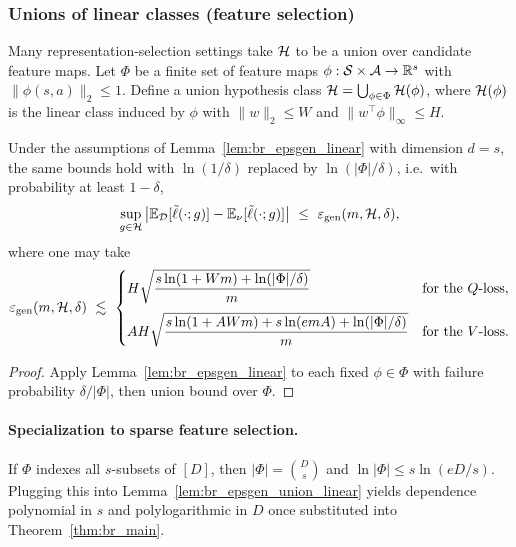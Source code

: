 \subsubsection{Unions of linear classes (feature selection)}

Many representation-selection settings take $\mathcal{H}$ to be a union over candidate feature maps.
Let $\Phi$ be a finite set of feature maps $\phi:\mathcal{S}\times\mathcal{A}\to\mathbb{R}^s$ with $\|\phi(s,a)\|_2\le 1$.
Define a union hypothesis class $\mathcal{H}=\bigcup_{\phi\in\Phi}\mathcal{H}(\phi)$, where $\mathcal{H}(\phi)$ is the
linear class induced by $\phi$ with $\|w\|_2\le W$ and $\|w^\top\phi\|_\infty\le H$.

\begin{lemma}
\label{lem:br_epsgen_union_linear}
Under the assumptions of Lemma~\ref{lem:br_epsgen_linear} with dimension $d=s$,
the same bounds hold with $\ln(1/\delta)$ replaced by $\ln(|\Phi|/\delta)$, i.e.\ with probability at
least $1-\delta$,
\[
\sup_{g\in\mathcal{H}}\big|\mathbb{E}_{\mathcal{D}}[\tilde{\ell}(\cdot;g)]-\mathbb{E}_{\nu}[\tilde{\ell}(\cdot;g)]\big|
\ \le\
\varepsilon_{\mathrm{gen}}(m,\mathcal{H},\delta),
\]
where one may take
\[
\varepsilon_{\mathrm{gen}}(m,\mathcal{H},\delta)
\ \lesssim\
\begin{cases}
H\sqrt{\dfrac{s\ln(1+Wm)+\ln(|\Phi|/\delta)}{m}} & \text{for the $Q$-loss},\\[10pt]
AH\sqrt{\dfrac{s\ln(1+AWm)+s\ln(e m A)+\ln(|\Phi|/\delta)}{m}} & \text{for the $V$-loss}.
\end{cases}
\]
\end{lemma}

\begin{proof}
Apply Lemma~\ref{lem:br_epsgen_linear} to each fixed $\phi\in\Phi$ with failure probability $\delta/|\Phi|$,
then union bound over $\Phi$.
\end{proof}

\paragraph{Specialization to sparse feature selection.}
If $\Phi$ indexes all $s$-subsets of $[D]$, then $|\Phi|=\binom{D}{s}$ and
$\ln|\Phi|\le s\ln(eD/s)$.
Plugging this into Lemma~\ref{lem:br_epsgen_union_linear} yields dependence polynomial in $s$ and
polylogarithmic in $D$ once substituted into Theorem~\ref{thm:br_main}.